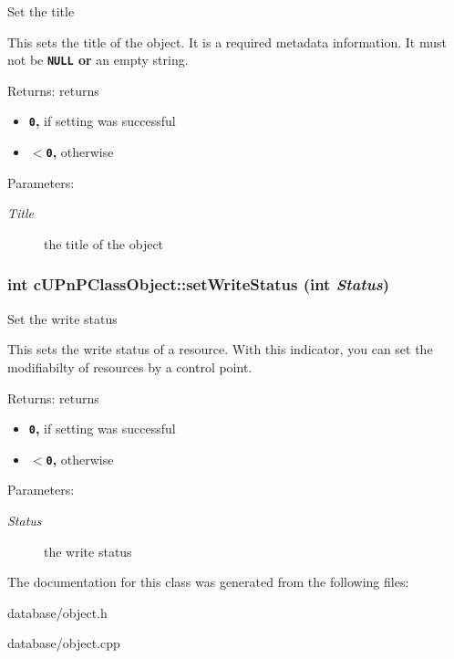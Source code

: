 Set the title

This sets the title of the object. It is a required metadata information. It must not be {\bf {\tt NULL} or} an empty string.

\begin{Desc}
\item[Returns:]returns\begin{itemize}
\item {\bf {\tt 0},} if setting was successful\item {\bf {\tt $<$0},} otherwise \end{itemize}
\end{Desc}
\begin{Desc}
\item[Parameters:]
\begin{description}
\item[{\em Title}]the title of the object \end{description}
\end{Desc}
\hypertarget{classcUPnPClassObject_4731b6c591544342da067f5abef5b661}{
\subsubsection[{setWriteStatus}]{\setlength{\rightskip}{0pt plus 5cm}int cUPnPClassObject::setWriteStatus (int {\em Status})}}
\label{classcUPnPClassObject_4731b6c591544342da067f5abef5b661}


Set the write status

This sets the write status of a resource. With this indicator, you can set the modifiabilty of resources by a control point.

\begin{Desc}
\item[Returns:]returns\begin{itemize}
\item {\bf {\tt 0},} if setting was successful\item {\bf {\tt $<$0},} otherwise \end{itemize}
\end{Desc}
\begin{Desc}
\item[Parameters:]
\begin{description}
\item[{\em Status}]the write status \end{description}
\end{Desc}


The documentation for this class was generated from the following files:\begin{CompactItemize}
\item 
database/object.h\item 
database/object.cpp\end{CompactItemize}
